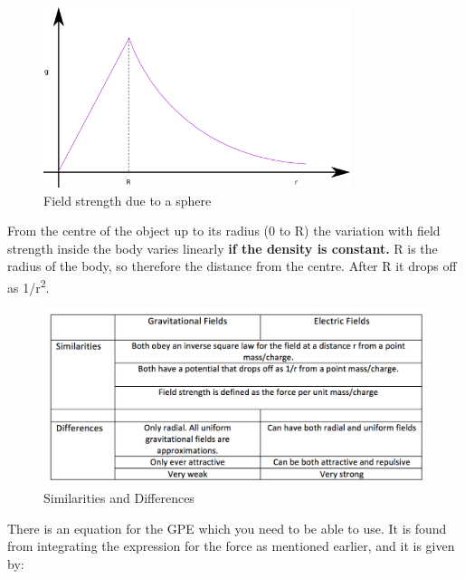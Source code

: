 \documentclass[main.tex]{subfiles}
\begin{document}
\begin{figure}[h]
  \begin{center}
  \includegraphics[width=0.8\textwidth]{figs/chapt-13/g-r.png}
\end{center}
  \caption{Field strength due to a sphere}
  \label{}
\end{figure}

From the centre of the object up to its radius (0 to R) the variation
with field strength inside the body varies linearly \textbf{if the
density is constant.} R is the radius of the body, so therefore the
distance from the centre. After R it drops off as
1/r\textsuperscript{2}.
\newpage
{}

\begin{figure}[h]
  \includegraphics[width=\textwidth]{figs/chapt-13/table.png}
  \caption{Similarities and Differences}
  \label{tab:sim}
\end{figure}


There is an equation for the GPE which you need to be able to use. It is
found from integrating the expression for the force as mentioned
earlier, and it is given by:
\end{document}
